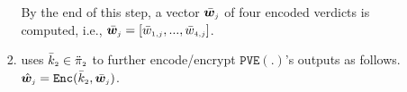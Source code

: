 \begin{enumerate}[leftmargin=.46cm]
\begin{enumerate}
\begin{enumerate}
\begin{enumerate}
%
%
\end{enumerate}
By the end of this step, a vector ${\bar {\bm w}}_{\scriptscriptstyle j}$ of four encoded verdicts is computed, i.e., $\bar {\bm w}_{\scriptscriptstyle j}=[ \bar{  w}_{\scriptscriptstyle 1,j},..., \bar{  w}_{\scriptscriptstyle 4,j}]$.
%
\item uses $\bar k_{\scriptscriptstyle 2}\in \ddot \pi_{\scriptscriptstyle 2}$ to further encode/encrypt  $\mathtt{PVE}(.)$'s outputs as follows. %
%
$ \hat {\bm w}_{\scriptscriptstyle j}= \mathtt{Enc}(\bar k_{\scriptscriptstyle 2}, \bar{\bm w}_{\scriptscriptstyle j})$.


%
%
%
%
%
\end{enumerate}


%
%
%
%



\end{enumerate}
\end{enumerate}
